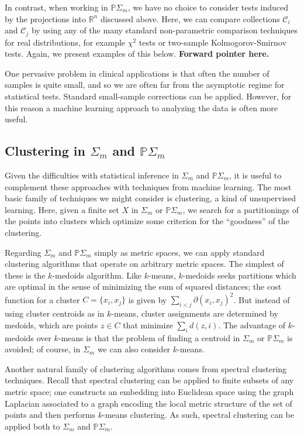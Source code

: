 \documentclass[a4paper,11pt]{article}
\newcommand{\aC}{\mathcal{C}}
\begin{document}
In contrast, when working in $\mathbb{P}\Sigma_m$, we have no choice to consider tests induced by the projections into $\mathbb{R}^n$ discussed above.
Here, we can compare collections $\aC_i$ and $\aC_j$ by using any of the many standard non-parametric comparison techniques for real distributions, for example $\chi^2$ tests or two-sample Kolmogorov-Smirnov tests.
Again, we present examples of this below. {\bf Forward pointer here.}

One pervasive problem in clinical applications is that often the number of samples is quite small, and so we are often far from the asymptotic regime for statistical tests.
Standard small-sample corrections can be applied.
However, for this reason a machine learning approach to analyzing the data is often more useful.

\subsection{Clustering in $\Sigma_m$ and $\mathbb{P}\Sigma_m$}

Given the difficulties with statistical inference in $\Sigma_m$ and $\mathbb{P}\Sigma_m$, it is useful to complement these approaches with techniques from machine learning.
The most basic family of techniques we might consider is clustering, a kind of unsupervised learning.
Here, given a finite set $X$ in $\Sigma_m$ or $\mathbb{P}\Sigma_m$, we search for a partitionings of the points into clusters which optimize some criterion for the ``goodness'' of the clustering.

Regarding $\Sigma_m$ and $\mathbb{P}\Sigma_m$ simply as metric spaces, we can apply standard clustering algorithms that operate on arbitrary metric spaces.
The simplest of these is the $k$-medoids algorithm.
Like $k$-means, $k$-medoids seeks partitions which are optimal in the sense of minimizing the sum of squared distances; the cost function for a cluster $C = \{x_i, x_j\}$ is given by $\sum_{i < j} \partial(x_i,x_j)^2$.
But instead of using cluster centroids as in $k$-means, cluster assignments are determined by medoids, which are points $z \in C$ that minimize $\sum_i d(z,i)$.
The advantage of $k$-medoids over $k$-means is that the problem of finding a centroid in $\Sigma_m$ or $\mathbb{P}\Sigma_m$ is avoided; of course, in $\Sigma_m$ we can also consider $k$-means.

Another natural family of clustering algorithms comes from spectral clustering techniques.
Recall that spectral clustering can be applied to finite subsets of any metric space; one constructs an embedding into Euclidean space using the graph Laplacian associated to a graph encoding the local metric structure of the set of points and then performs $k$-means clustering.
As such, spectral clustering can be applied both to $\Sigma_m$ and $\mathbb{P}\Sigma_m$.
\end{document}
